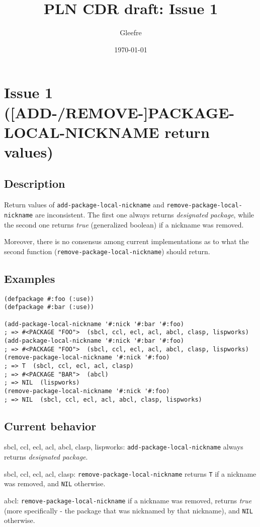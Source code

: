 \documentclass[11pt]{article}
\author{Gleefre}
\date{\today}
\title{PLN CDR draft: Issue 1}
\begin{document}
\maketitle

\section{Issue 1 ([ADD-/REMOVE-]PACKAGE-LOCAL-NICKNAME return values)}
\label{sec:org93e2b52}
\subsection{Description}
\label{sec:orgfaf5731}
Return values of \texttt{add-package-local-nickname} and \texttt{remove-package-local-nickname}
are inconsistent. The first one always returns \emph{designated package}, while the
second one returns \emph{true} (generalized boolean) if a nickname was removed.

Moreover, there is no consensus among current implementations as to what the second
function (\texttt{remove-package-local-nickname}) should return.
\subsection{Examples}
\label{sec:org02b218f}
\begin{verbatim}
(defpackage #:foo (:use))
(defpackage #:bar (:use))

(add-package-local-nickname '#:nick '#:bar '#:foo)
; => #<PACKAGE "FOO">  (sbcl, ccl, ecl, acl, abcl, clasp, lispworks)
(add-package-local-nickname '#:nick '#:bar '#:foo)
; => #<PACKAGE "FOO">  (sbcl, ccl, ecl, acl, abcl, clasp, lispworks)
(remove-package-local-nickname '#:nick '#:foo)
; => T  (sbcl, ccl, ecl, acl, clasp)
; => #<PACKAGE "BAR">  (abcl)
; => NIL  (lispworks)
(remove-package-local-nickname '#:nick '#:foo)
; => NIL  (sbcl, ccl, ecl, acl, abcl, clasp, lispworks)
\end{verbatim}
\subsection{Current behavior}
\label{sec:org57f017e}
sbcl, ccl, ecl, acl, abcl, clasp, lispworks:
  \texttt{add-package-local-nickname} always returns \emph{designated package}.

sbcl, ccl, ecl, acl, clasp:
  \texttt{remove-package-local-nickname} returns \texttt{T} if a nickname was removed,
  and \texttt{NIL} otherwise.

abcl:
  \texttt{remove-package-local-nickname} if a nickname was removed, returns \emph{true} (more
  specifically - the package that was nicknamed by that nickname), and \texttt{NIL}
  otherwise.
\end{document}
